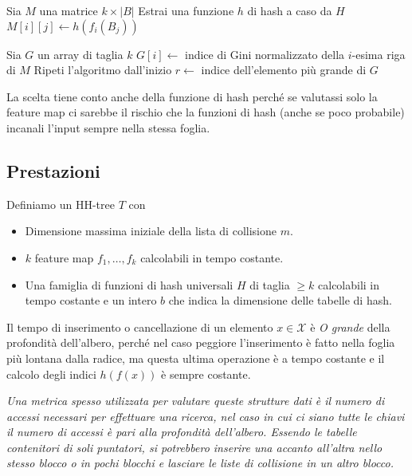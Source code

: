 \documentclass[a4paper]{article}
\begin{document}
\begin{algorithm}[H]
	\DontPrintSemicolon

	\;


	Sia $M$ una matrice $k \times |B|$ \;
	Estrai una funzione $h$ di hash a caso da $H$ \;
	 {
		 {
			$M[i][j] \gets h(f_i(B_j))$ \;
		}
	}

	Sia $G$ un array di taglia $k$ \;
	 {
		$G[i] \gets$ indice di Gini normalizzato della $i$-esima riga di $M$ \;
	}
	 {
		Ripeti l'algoritmo dall'inizio \;
	}
	$r \gets$ indice dell'elemento più grande di $G$ \;


	\;

\end{algorithm}
La scelta tiene conto anche della funzione di hash perché se valutassi solo la feature map ci sarebbe il rischio che la funzioni di hash (anche se poco probabile) incanali l'input sempre nella stessa foglia.

\subsection*{Prestazioni}

Definiamo un HH-tree $T$ con
\begin{itemize}
	\item Dimensione massima iniziale della lista di collisione $m$.
	\item $k$ feature map $f_1, \ldots, f_k$ calcolabili in tempo costante.
	\item Una famiglia di funzioni di hash universali $H$ di taglia $\geq k$ calcolabili in tempo costante e un intero $b$ che indica la dimensione delle tabelle di hash.
\end{itemize}
Il tempo di inserimento o cancellazione di un elemento $x \in \mathcal{X}$ è \textit{O grande} della profondità dell'albero, perché nel caso peggiore l'inserimento è fatto nella foglia più lontana dalla radice, ma questa ultima operazione è a tempo costante e il calcolo degli indici $h(f(x))$ è sempre costante.

\textit{Una metrica spesso utilizzata per valutare queste strutture dati è il numero di accessi necessari per effettuare una ricerca, nel caso in cui ci siano tutte le chiavi il numero di accessi è pari alla profondità dell'albero. Essendo le tabelle contenitori di soli puntatori, si potrebbero inserire una accanto all'altra nello stesso blocco o in pochi blocchi e lasciare le liste di collisione in un altro blocco.}
\end{document}
